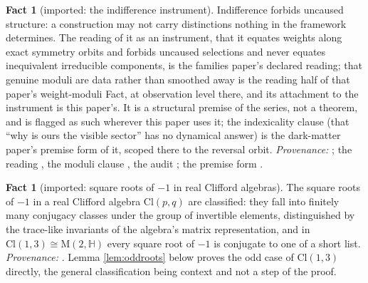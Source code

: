 \documentclass[11pt]{article}
\theoremstyle{definition}
\newtheorem{fact}[theorem]{Fact}
\newcommand{\Cl}{\mathrm{Cl}}
\newcommand{\Mat}{\mathrm{M}}
\begin{document}
\begin{fact}[imported: the indifference instrument]\label{fact:indifference}
Indifference forbids uncaused structure: a construction may not carry distinctions nothing in the framework determines. The reading of it as an instrument, that it equates weights along exact symmetry orbits and forbids uncaused selections and never equates inequivalent irreducible components, is the families paper's declared reading; that genuine moduli are data rather than smoothed away is the reading half of that paper's weight-moduli Fact, at observation level there, and its attachment to the instrument is this paper's. It is a structural premise of the series, not a theorem, and is flagged as such wherever this paper uses it; the indexicality clause (that ``why is ours the visible sector'' has no dynamical answer) is the dark-matter paper's premise form of it, scoped there to the reversal orbit. \emph{Provenance:} \cite[Principle~5.4]{ButlerT8}; the reading \cite[Fact~2.5]{ButlerT13}, the moduli clause \cite[Fact~2.4]{ButlerT13}, the audit \cite[\S5]{ButlerT13}; the premise form \cite[Premise~2.2]{ButlerT14}.
\end{fact}


\begin{fact}[imported: square roots of $-1$ in real Clifford algebras]\label{fact:roots}
The square roots of $-1$ in a real Clifford algebra $\Cl(p,q)$ are classified: they fall into finitely many conjugacy classes under the group of invertible elements, distinguished by the trace-like invariants of the algebra's matrix representation, and in $\Cl(1,3) \cong \Mat(2, \mathbb{H})$ every square root of $-1$ is conjugate to one of a short list. \emph{Provenance:} \cite{HitzerAblamowiczSangwine2013}. Lemma \ref{lem:oddroots} below proves the odd case of $\Cl(1,3)$ directly, the general classification being context and not a step of the proof.
\end{fact}
\end{document}
